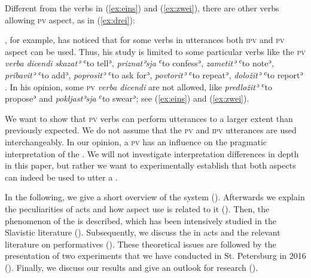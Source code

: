 \documentclass[output=paper,colorlinks,citecolor=brown,newtxmath,hidelinks]{langscibook}
\begin{document}
\noindent Different from the verbs in (\ref{ex:eins}) and (\ref{ex:zwei}), there are other  verbs allowing \textsc{pv} aspect, as in (\ref{ex:drei}):

\ea\label{ex:drei}
            \z
\z

\noindent\citet{Dickey2000}, for example, has noticed that for some  verbs in  utterances both \textsc{ipv} and \textsc{pv} aspect can be used. Thus, his study is limited to some particular verbs like the \textsc{pv} \textit{verba dicendi} \textit{skazatʾ} ʿto tellʾ, \textit{priznatʾsja} ʿto confessʾ, \textit{zametitʾ} ʿto noteʾ, \textit{pribavitʾ} ʿto addʾ, \textit{poprositʾ} ʿto ask forʾ, \textit{povtoritʾ} ʿto repeatʾ, \textit{doložitʾ} ʿto reportʾ \citep[179]{Dickey2000}. In his opinion, some \textsc{pv} \textit{verba dicendi} are not allowed, like \textit{predložitʾ} ʿto proposeʾ and \textit{pokljastʾsja} ʿto swearʾ; see (\ref{ex:eins}) and (\ref{ex:zwei}).

We want to show that \textsc{pv}  verbs can perform  utterances to a larger extent than previously expected. We do not assume that the \textsc{pv} and \textsc{ipv}  utterances are used interchangeably. In our opinion, a \textsc{pv}  has an influence on the pragmatic interpretation of the . We will not investigate interpretation differences in depth in this paper, but rather we want to experimentally establish that both aspects can indeed be used to utter a . 

In the following, we give a short overview of the   system (). Afterwards we explain the peculiarities of  acts and how aspect use is related to it (). Then, the phenomenon of the   is described, which has been intensively studied in the Slavistic literature (). Subsequently, we discuss the   in  acts and  the relevant literature on  performatives (). These theoretical issues are followed by the presentation of two experiments that we have conducted in St. Petersburg in 2016 (). Finally, we discuss our results and give an outlook for  research ().
\end{document}
